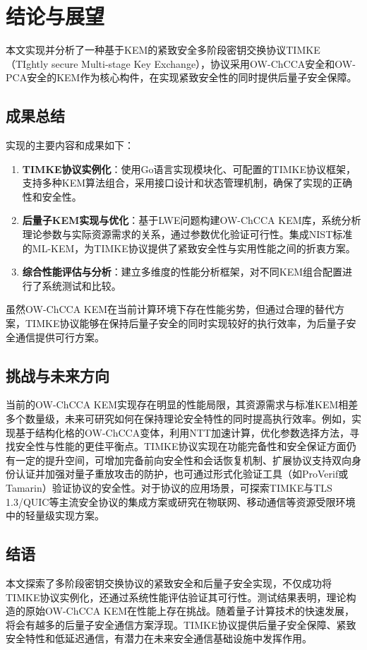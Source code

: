 \section{结论与展望}

本文实现并分析了一种基于KEM的紧致安全多阶段密钥交换协议TIMKE（TIghtly secure Multi-stage Key Exchange），协议采用OW-ChCCA安全和OW-PCA安全的KEM作为核心构件，在实现紧致安全性的同时提供后量子安全保障。

\subsection{成果总结}

实现的主要内容和成果如下：

\begin{enumerate}
  \item \textbf{TIMKE协议实例化}：使用Go语言实现模块化、可配置的TIMKE协议框架，支持多种KEM算法组合，采用接口设计和状态管理机制，确保了实现的正确性和安全性。

  \item \textbf{后量子KEM实现与优化}：基于LWE问题构建OW-ChCCA KEM库，系统分析理论参数与实际资源需求的关系，通过参数优化验证可行性。集成NIST标准的ML-KEM，为TIMKE协议提供了紧致安全性与实用性能之间的折衷方案。

  \item \textbf{综合性能评估与分析}：建立多维度的性能分析框架，对不同KEM组合配置进行了系统测试和比较。
\end{enumerate}

虽然OW-ChCCA KEM在当前计算环境下存在性能劣势，但通过合理的替代方案，TIMKE协议能够在保持后量子安全的同时实现较好的执行效率，为后量子安全通信提供可行方案。

\subsection{挑战与未来方向}

当前的OW-ChCCA KEM实现存在明显的性能局限，其资源需求与标准KEM相差多个数量级，未来可研究如何在保持理论安全特性的同时提高执行效率。例如，实现基于结构化格的OW-ChCCA变体，利用NTT加速计算，优化参数选择方法，寻找安全性与性能的更佳平衡点。TIMKE协议实现在功能完备性和安全保证方面仍有一定的提升空间，可增加完备前向安全性和会话恢复机制、扩展协议支持双向身份认证并加强对量子重放攻击的防护，也可通过形式化验证工具（如ProVerif或Tamarin）验证协议的安全性。对于协议的应用场景，可探索TIMKE与TLS 1.3/QUIC等主流安全协议的集成方案或研究在物联网、移动通信等资源受限环境中的轻量级实现方案。

\subsection{结语}

本文探索了多阶段密钥交换协议的紧致安全和后量子安全实现，不仅成功将TIMKE协议实例化，还通过系统性能评估验证其可行性。测试结果表明，理论构造的原始OW-ChCCA KEM在性能上存在挑战。随着量子计算技术的快速发展，将会有越多的后量子安全通信方案浮现。TIMKE协议提供后量子安全保障、紧致安全特性和低延迟通信，有潜力在未来安全通信基础设施中发挥作用。